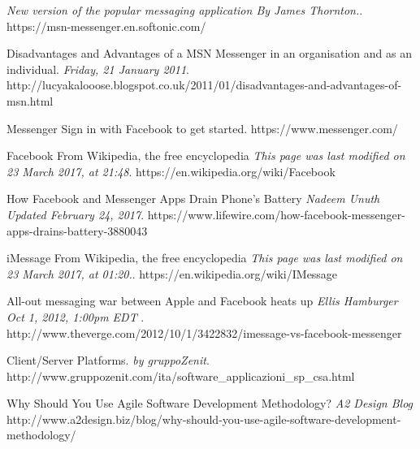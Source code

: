 \documentclass{article}
\begin{document}
	\newpage
	\begin{thebibliography}{9}
		\textit{New version of the popular messaging application  By James Thornton.}. 
		https://msn-messenger.en.softonic.com/

		Disadvantages and Advantages of a MSN Messenger in an organisation and as an individual. 
		\textit{Friday, 21 January 2011}. 
		http://lucyakalooose.blogspot.co.uk/2011/01/disadvantages-and-advantages-of-msn.html
		
		Messenger
		Sign in with Facebook to get started.
		\textit{}
		https://www.messenger.com/
		
		Facebook
		From Wikipedia, the free encyclopedia
		\textit{This page was last modified on 23 March 2017, at 21:48}. 
		https://en.wikipedia.org/wiki/Facebook
		
		How Facebook and Messenger Apps Drain Phone's Battery 
		\textit{Nadeem Unuth
		Updated February 24, 2017}. 
		https://www.lifewire.com/how-facebook-messenger-apps-drains-battery-3880043
		
		iMessage From Wikipedia, the free encyclopedia 
		\textit{ This page was last modified on 23 March 2017, at 01:20.}. 
		https://en.wikipedia.org/wiki/IMessage
		
		All-out messaging war between Apple and Facebook heats up
		\textit{Ellis Hamburger  Oct 1, 2012, 1:00pm EDT }. 
		http://www.theverge.com/2012/10/1/3422832/imessage-vs-facebook-messenger
		
		Client/Server Platforms. 
		\textit{by gruppoZenit}. \\
		http://www.gruppozenit.com/ita/software\_applicazioni\_sp\_csa.html
		
		Why Should You Use Agile Software Development Methodology?
		\textit{A2 Design Blog}
		http://www.a2design.biz/blog/why-should-you-use-agile-software-development-methodology/
	
	\end{thebibliography}
	
	
	
\end{document}
